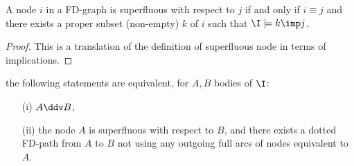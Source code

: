 \begin{proposition} \label{prop:maier.equiv_sup_sub}
A node $i$ in a FD-graph is superfluous with respect to $j$ if and only if 
$i \equiv j$ and there exists a proper subset (non-empty) $k$ of $i$ such 
that $\I \models k \imp j$. 
\end{proposition}

\begin{proof} This is a translation of the definition of superfluous node in 
terms of implications.	
\end{proof}

\begin{proposition} \label{prop:maier.equiv_ssup_dd}
the following statements are equivalent, for $A, B$ bodies of $\I$:
\begin{itemize}
	\item[(i)] $A \ddv B$,
	\item[(ii)] the node $A$ is superfluous with respect to $B$, and there 
	exists 
	a dotted FD-path from $A$ to $B$ not using any outgoing full arcs of
	nodes equivalent to $A$.
\end{itemize}
	
\end{proposition}

